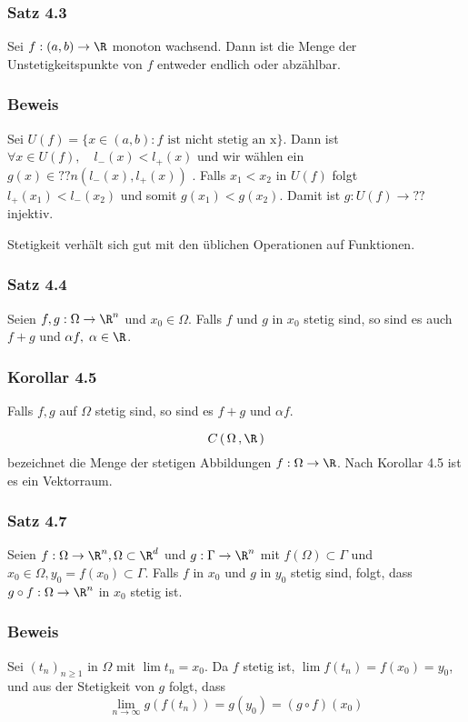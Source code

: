 \subsubsection*{Satz 4.3}
Sei $f:(a,b)\to\R$ monoton wachsend. Dann ist die Menge der Unstetigkeitspunkte von $f$ entweder endlich oder abzählbar.
\subsubsection*{Beweis}
Sei $U(f) = \{x\in(a,b):f \text{ ist nicht stetig an x}\}$. Dann ist $\forall x\in U(f), \quad l_{-}(x) < l_{+}(x)$ und wir wählen ein $g(x)\in ??n(l_{-}(x),l_{+}(x))$ .
Falls $x_{1}<x_{2}$ in $U(f)$ folgt $l_{+}(x_{1})<l_{-}(x_{2})$ und somit $g(x_{1})<g(x_{2})$. Damit ist $g:U(f)\to ??$  injektiv. 

\noindent Stetigkeit verhält  sich gut mit den üblichen Operationen auf Funktionen.

\subsubsection*{Satz 4.4}
Seien $f,g:\Omega \to \R^{n}$ und $x_{0}\in\Omega$. Falls $f$ und $g$ in $x_{0}$ stetig sind, so sind es auch $f+g$ und $\alpha f, \; \alpha \in \R$.

\subsubsection*{Korollar 4.5}
Falls $f,g$ auf $\Omega$ stetig sind, so sind es $f+g$ und $\alpha f$.
 
\begin{definition}{4.6}
\[ C\,(\,\Omega\, , \R\,) \] bezeichnet die Menge der stetigen Abbildungen $f: \Omega\to\R$. Nach Korollar 4.5 ist es ein Vektorraum.
\end{definition}

\subsubsection*{Satz 4.7}
Seien $f:\Omega\to\R^{n}, \Omega \subset \R^{d}$ und $g:\Gamma \to \R^{n}$ mit $f(\Omega)\subset\Gamma$ und ${x_{0}\in\Omega}, {y_{0}=f(x_{0})\subset\Gamma}$. Falls $f$ in $x_{0}$ und $g$ in $y_{0}$ stetig sind, folgt, dass $g\circ f:\Omega\to\R^{n}$ in $x_{0}$ stetig ist.

\subsubsection*{Beweis}
Sei $(t_{n})_{n\geq1}$ in $\Omega$ mit $\lim{t_{n}} = x_{0}$. Da $f$ stetig ist, $\lim{f(t_{n})} = f(x_{0}) = y_{0}$, und aus der Stetigkeit von $g$ folgt, dass \[ \lim_{n\to\infty}{g(f(t_{n}))} = g(y_{0}) = (g \circ f)(x_{0}) \]

